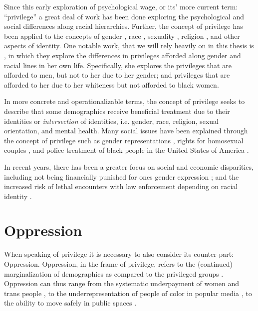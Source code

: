 Since this early exploration of psychological wage, or its' more current term: ``privilege'' a great deal of work has been done exploring the psychological and social differences along racial hierarchies. Further, the concept of privilege has been applied to the concepts of gender \citep{Beauvoir:1953,Butler:1990}, race \citep{Crenshaw:1989,Dubois:1935}, sexuality \citep{Foucault:1978}, religion \citep{Beaman:2003}, and other aspects of identity. One notable work, that we will rely heavily on in this thesis is \cite{McIntosh:1988}, in which they explore the differences in privileges afforded along gender and racial lines in her own life. Specifically, she explores the privileges that are afforded to men, but not to her due to her gender; and privileges that are afforded to her due to her whiteness but not afforded to black women.\vspace{5mm}

In more concrete and operationalizable terms, the concept of privilege seeks to describe that some demographics receive beneficial treatment due to their identities or \textit{intersection} of identities, i.e. gender, race, religion, sexual orientation, and mental health. Many social issues have been explained through the concept of privilege such as gender representations \citep{Butler:1990}, rights for homosexual couples \citep{Foucault:1978}, and police treatment of black people in the United States of America \citep{Voigt:2017}. 

In recent years, there has been a greater focus on social and economic disparities, including not being financially punished for ones gender expression \citep{Lombardi:2002}; and the increased risk of lethal encounters with law enforcement depending on racial identity \citep{Zack:2015}.

\section{Oppression}\label{sec:oppression}
When speaking of privilege it is necessary to also consider its counter-part: Oppression. Oppression, in the frame of privilege, refers to the (continued) marginalization of demographics as compared to the privileged groups \citep{Abberley:1987}. Oppression can thus range from the systematic underpayment of women and trans people \citep{Lombardi:2002,Pew:2018}, to the underrepresentation of people of color in popular media \citep{Dixon:2006}, to the ability to move safely in public spaces \citep{Valentine:1989}. 

